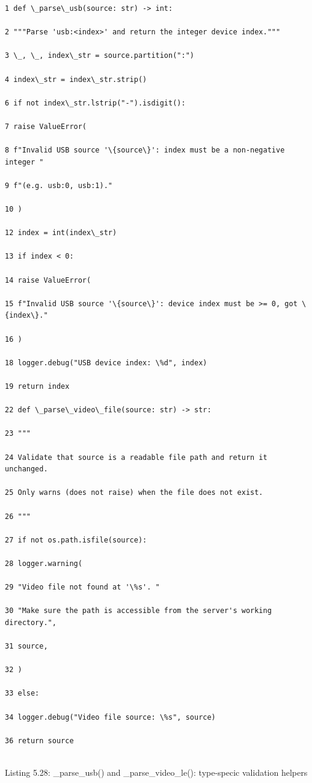 \begin{listingbox}
	\begin{verbatim}
1 def \_parse\_usb(source: str) -> int:

2 """Parse 'usb:<index>' and return the integer device index."""

3 \_, \_, index\_str = source.partition(":")

4 index\_str = index\_str.strip()

6 if not index\_str.lstrip("-").isdigit():

7 raise ValueError(

8 f"Invalid USB source '\{source\}': index must be a non-negative integer "

9 f"(e.g. usb:0, usb:1)."

10 )

12 index = int(index\_str)

13 if index < 0:

14 raise ValueError(

15 f"Invalid USB source '\{source\}': device index must be >= 0, got \{index\}."

16 )

18 logger.debug("USB device index: \%d", index)

19 return index

22 def \_parse\_video\_file(source: str) -> str:

23 """

24 Validate that source is a readable file path and return it unchanged.

25 Only warns (does not raise) when the file does not exist.

26 """

27 if not os.path.isfile(source):

28 logger.warning(

29 "Video file not found at '\%s'. "

30 "Make sure the path is accessible from the server's working directory.",

31 source,

32 )

33 else:

34 logger.debug("Video file source: \%s", source)

36 return source


\end{verbatim}
\end{listingbox}
Listing 5.28: \_parse\_usb() and \_parse\_video\_le(): type-specic validation helpers

